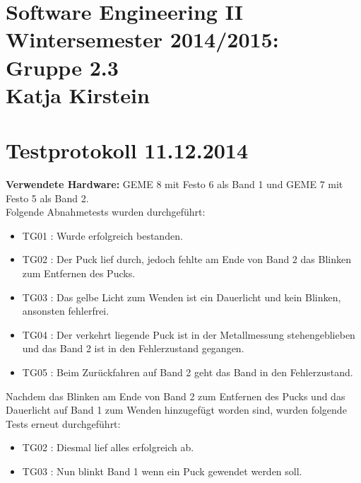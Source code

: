 \documentclass[a4paper,10pt]{article}
\begin{document}
\section*{\small{Software Engineering II \\ Wintersemester 2014/2015: Gruppe 2.3 \\ Katja Kirstein}}
\section*{Testprotokoll 11.12.2014}
\textbf{Verwendete Hardware:} GEME 8 mit Festo 6 als Band 1 und GEME 7 mit Festo 5 als Band 2.\\
Folgende Abnahmetests wurden durchgeführt:
\newline
\begin{itemize}
 \item TG01 : Wurde erfolgreich bestanden.
 \item TG02 : Der Puck lief durch, jedoch fehlte am Ende von Band 2 das Blinken zum Entfernen des Pucks.
 \item TG03 : Das gelbe Licht zum Wenden ist ein Dauerlicht und kein Blinken, ansonsten fehlerfrei.
 \item TG04 : Der verkehrt liegende Puck ist in der Metallmessung stehengeblieben und das Band 2 ist in den Fehlerzustand gegangen.
 \item TG05 : Beim Zurückfahren auf Band 2 geht das Band in den Fehlerzustand.\\\newline
\end{itemize}
Nachdem das Blinken am Ende von Band 2 zum Entfernen des Pucks und das Dauerlicht auf Band 1 zum Wenden hinzugefügt worden sind, wurden folgende Tests erneut durchgeführt:
\begin{itemize}
 \item TG02 : Diesmal lief alles erfolgreich ab.
 \item TG03 : Nun blinkt Band 1 wenn ein Puck gewendet werden soll.
\end{itemize}
\end{document}
